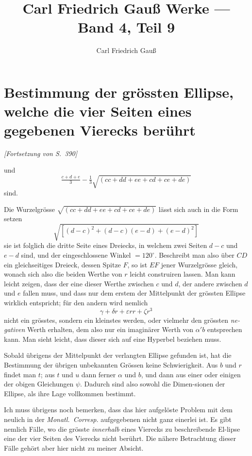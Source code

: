 \documentclass[12pt,a4paper]{article}
\title{Carl Friedrich Gau\ss{} Werke --- Band 4, Teil 9}
\author{Carl Friedrich Gau\ss{}}
\date{}
\begin{document}
\maketitle
\thispagestyle{empty}

\tableofcontents
\newpage

\section*{Bestimmung der gr\"ossten Ellipse, welche die vier Seiten eines gegebenen
Vierecks ber\"uhrt}
\markboth{}{}

\begin{center}
\textit{[Fortsetzung von S.~390]}
\end{center}

und
\[
\tfrac{c+d+e}{3} - \tfrac{1}{3}\sqrt{(cc+dd+ee+cd+ce+de)}
\]
sind.

Die Wurzelgr\"osse $\sqrt{(cc+dd+ee+cd+ce+de)}$ l\"asst sich auch in die
Form setzen
\[
\sqrt{[(d-c)^2+(d-c)(e-d)+(e-d)^2]}
\]
sie ist folglich die dritte Seite eines Dreiecks, in welchem zwei Seiten $d-c$ und
$e-d$ sind, und der eingeschlossene Winkel $=120^\circ$. Beschreibt man also \"uber
$CD$ ein gleichseitiges Dreieck, dessen Spitze $F$, so ist $EF$ jener Wurzelgr\"osse
gleich, wonach sich also die beiden Werthe von $r$ leicht construiren lassen. Man
kann leicht zeigen, dass der eine dieser Werthe zwischen $c$ und $d$, der andere
zwischen $d$ und $e$ fallen muss, und dass nur dem erstem der Mittelpunkt der
gr\"ossten Ellipse wirklich entspricht; f\"ur den andern wird nemlich
\[
\gamma + \delta r + \varepsilon rr + \zeta r^3
\]
nicht ein gr\"osstes, sondern ein kleinstes werden, oder vielmehr den gr\"ossten \textit{ne-\/gativen} Werth erhalten, dem also nur ein imagin\"arer Werth von $\alpha'\mathit{b}$ entsprechen
kann. Man sieht leicht, dass dieser sich auf eine Hyperbel beziehen muss.

Sobald \"ubrigens der Mittelpunkt der verlangten Ellipse gefunden ist, hat
die Bestimmung der \"ubrigen unbekannten Gr\"ossen keine Schwierigkeit. Aus $\mathit{b}$
und $r$ findet man $t$; aus $t$ und $u$ dann ferner $\alpha$ und $\mathit{b}$, und dann aus einer
oder einigen der obigen Gleichungen $\psi$. Dadurch sind also sowohl die Dimen-\/sionen der Ellipse, als ihre Lage vollkommen bestimmt.

Ich muss \"ubrigens noch bemerken, dass das hier aufgel\"oste Problem mit
dem neulich in der \textit{Monatl.~Corresp.} aufgegebenen nicht ganz einerlei ist. Es
gibt nemlich F\"alle, wo die gr\"osste \textit{innerhalb} eines Vierecks zu beschreibende El-\/lipse eine der vier Seiten des Vierecks nicht ber\"uhrt. Die n\"ahere Betrachtung
dieser F\"alle geh\"ort aber hier nicht zu meiner Absicht.
\end{document}
